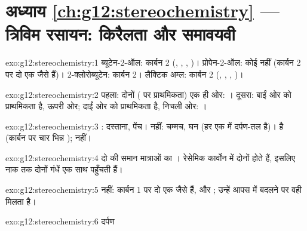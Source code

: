 \section*{अध्याय \ref{ch:g12:stereochemistry} --- त्रिविम रसायन: किरैलता और समावयवी}

\begin{solution}{exo:g12:stereochemistry:1}
ब्यूटेन-2-ऑल: कार्बन 2 (, , , )।
प्रोपेन-2-ऑल: कोई नहीं (कार्बन 2 पर दो एक जैसे  हैं)।
2-क्लोरोब्यूटेन: कार्बन 2। लैक्टिक अम्ल: कार्बन 2 (, ,
, )।
\end{solution}

\begin{solution}{exo:g12:stereochemistry:2}
पहला: दोनों  ( पर प्राथमिकता) एक ही ओर: ।
दूसरा: बाईं ओर  को प्राथमिकता है, ऊपरी ओर; दाईं ओर
 को प्राथमिकता है, निचली ओर: ।
\end{solution}

\begin{solution}{exo:g12:stereochemistry:3}
: दस्ताना, पेंच।  नहीं: चम्मच, घन (हर एक में
दर्पण-तल है)।   है (कार्बन पर चार भिन्न );
 नहीं।
\end{solution}

\begin{solution}{exo:g12:stereochemistry:4}
दो  की समान मात्राओं का । रेसेमिक कार्वोन में
दोनों  होते हैं, इसलिए नाक तक दोनों गंधें एक साथ पहुँचती हैं।
\end{solution}

\begin{solution}{exo:g12:stereochemistry:5}
नहीं: कार्बन 1 पर दो एक जैसे  हैं,  और ; उन्हें आपस में बदलने पर
वही  मिलता है।
\end{solution}

\begin{solution}{exo:g12:stereochemistry:6}
 \quad दर्पण
\quad {}
\end{solution}

